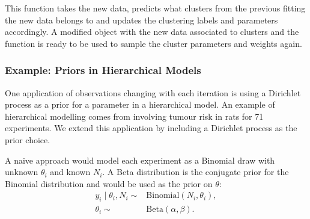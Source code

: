 \documentclass[nojss]{jss}
\begin{document}
This function takes the new data, predicts what clusters from the previous fitting the new data belongs to and updates the clustering labels and parameters accordingly. A modified object with the new data associated to clusters and the function  is ready to be used to sample the cluster parameters and weights again.

\subsubsection{Example: Priors in Hierarchical Models}
One application of observations changing with each iteration is using a Dirichlet process as a prior for a parameter in a hierarchical model. An example of hierarchical modelling comes from \cite{gelman_bayesian_2014} involving tumour risk in rats for 71 experiments. We extend this application by including a Dirichlet process as the prior choice.

A naive approach would model each experiment as a Binomial draw with unknown $\theta _i$ and known $N_i$. A Beta distribution is the conjugate prior for the Binomial distribution and would be used as the prior on $\theta$:
\begin{align*}
y_i \mid \theta_i, N_i \sim & \text{Binomial}(N_i,\theta_i), \\
\theta_i \sim & \text{Beta}(\alpha, \beta).
\end{align*}
\end{document}
